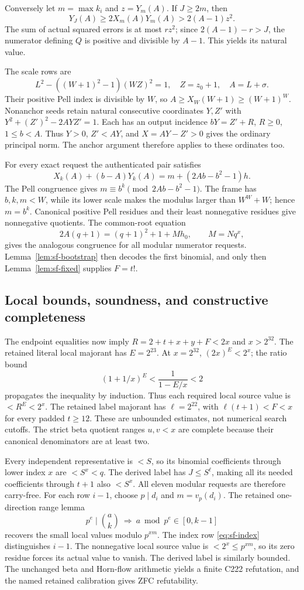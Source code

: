 Conversely let \(m=\max k_i\) and \(z=Y_m(A)\).
If \(J\ge2m\), then
\[
 Y_J(A)\ge2X_m(A)Y_m(A)>2(A-1)z^2.
\]
The sum of actual squared errors is at most \(r z^2\); since
\(2(A-1)-r>J\), the numerator defining \(Q\) is positive and divisible
by \(A-1\). This yields its natural value.

The scale rows are
\[
 L^2-((W+1)^2-1)(WZ)^2=1,\quad Z=z_0+1,\quad A=L+\sigma.
\]
Their positive Pell index is divisible by \(W\), so
\(A\ge X_W(W+1)\ge(W+1)^W\). Nonanchor seeds retain natural
consecutive coordinates \(Y,Z'\) with
\(Y^2+(Z')^2-2AYZ'=1\). Each has an output incidence
\(bY=Z'+R\), \(R\ge0\), \(1\le b<A\). Thus \(Y>0\),
\(Z'<AY\), and \(X=AY-Z'>0\) gives the ordinary principal norm.
The anchor argument therefore applies to these ordinates too.

For every exact request the authenticated pair satisfies
\[
 X_k(A)+(b-A)Y_k(A)=m+(2Ab-b^2-1)h.
\]
The Pell congruence gives \(m\equiv b^k\pmod{2Ab-b^2-1}\).
The frame has \(b,k,m<W\), while its lower scale makes the modulus
larger than \(W^W+W\); hence \(m=b^k\). Canonical positive Pell
residues and their least nonnegative residues give nonnegative quotients.
The common-root equation
\[
 2A(q+1)=(q+1)^2+1+Mh_0,\qquad M=Nq^x,
\]
gives the analogous congruence for all modular numerator requests.
Lemma~\ref{lem:sf-bootstrap} then decodes the first binomial, and only
then Lemma~\ref{lem:sf-fixed} supplies \(F=t!\).

\subsection{Local bounds, soundness, and constructive completeness}
The endpoint equalities now imply
\(R=2+t+x+y+F<2x\) and \(x>2^{32}\).
The retained literal local majorant has \(E=2^{23}\).
At \(x=2^{32}\), \((2x)^E<2^x\); the ratio bound
\[
 (1+1/x)^E<\frac1{1-E/x}<2
\]
propagates the inequality by induction. Thus each required local source
value is \(<R^E<2^x\). The retained label majorant has
\(\ell=2^{22}\), with \(\ell(t+1)<F<x\) for every padded
\(t\ge12\). These are unbounded estimates, not numerical search
cutoffs. The strict beta quotient ranges \(u,v<x\) are complete because
their canonical denominators are at least two.

Every independent representative is \(<S\), so its binomial
coefficients through lower index \(x\) are \(<S^x<q\).
The derived label has \(J\le S^\ell\), making all its needed
coefficients through \(t+1\) also \(<S^x\). All eleven modular requests
are therefore carry-free. For each row \(i-1\), choose \(p\mid d_i\)
and \(m=v_p(d_i)\). The retained one-direction range lemma
\[
 p^e\mid\binom ak\ \Longrightarrow\ a\bmod p^e\in[0,k-1]
\]
recovers the small local values modulo \(p^{xm}\). The index row
\eqref{eq:sf-index} distinguishes \(i-1\). The nonnegative local
source value is \(<2^x\le p^{xm}\), so its zero residue forces its
actual value to vanish. The derived label is similarly bounded.
The unchanged beta and Horn-flow arithmetic yields a finite C222
refutation, and the named retained calibration gives ZFC refutability.

